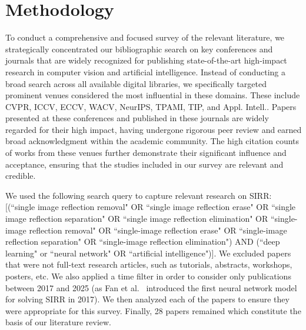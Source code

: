 \section{Methodology}
\label{sec:methodology}
To conduct a comprehensive and focused survey of the relevant literature, we strategically concentrated our bibliographic search on key conferences and journals that are widely recognized for publishing state-of-the-art high-impact research in computer vision and artificial intelligence. Instead of conducting a broad search across all available digital libraries, we specifically targeted prominent venues considered the most influential in these domains. These include CVPR, ICCV, ECCV, WACV, NeurIPS, TPAMI, TIP, and Appl. Intell.. Papers presented at these conferences and published in these journals are widely regarded for their high impact, having undergone rigorous peer review and earned broad acknowledgment within the academic community. The high citation counts of works from these venues further demonstrate their significant influence and acceptance, ensuring that the studies included in our survey are relevant and credible.

We used the following search query to capture relevant research on SIRR:  [(``single image reflection removal" OR ``single image reflection erase" OR ``single image reflection separation" OR ``single image reflection elimination" OR ``single-image reflection removal" OR ``single-image reflection erase" OR ``single-image reflection separation" OR ``single-image reflection elimination") AND (``deep learning" or ``neural network" OR ``artificial intelligence")]. We excluded papers that were not full-text research articles, such as tutorials, abstracts, workshops, posters, etc. We also applied a time filter in order to consider only publications between 2017 and 2025 (as Fan et al.~\cite{fan2017generic} introduced the first neural network model for solving SIRR in 2017). We then analyzed each of the papers to ensure they were appropriate for this survey. Finally, 28 papers remained which constitute the basis of our literature review.